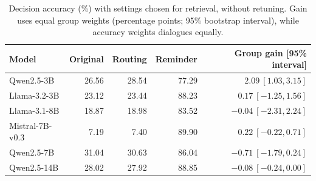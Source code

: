 \begin{table}[htbp]
\centering
\footnotesize
\setlength{\tabcolsep}{5pt}
\caption{Decision accuracy (\%) with settings chosen for retrieval, without
retuning. Gain uses equal group weights (percentage points; 95\% bootstrap
interval), while accuracy weights dialogues equally.}
\label{tab:repair-transfer}
\begin{tabular}{@{}lrrrr@{}}
\toprule
Model & Original & Routing & Reminder & Group gain [95\% interval] \\
\midrule
Qwen2.5-3B & 26.56 & 28.54 & 77.29 & $2.09\ [1.03, 3.15]$ \\
Llama-3.2-3B & 23.12 & 23.44 & 88.23 & $0.17\ [-1.25, 1.56]$ \\
Llama-3.1-8B & 18.87 & 18.98 & 83.52 & $-0.04\ [-2.31, 2.24]$ \\
Mistral-7B-v0.3 & 7.19 & 7.40 & 89.90 & $0.22\ [-0.22, 0.71]$ \\
\addlinespace[2pt]
Qwen2.5-7B & 31.04 & 30.63 & 86.04 & $-0.71\ [-1.79, 0.24]$ \\
Qwen2.5-14B & 28.02 & 27.92 & 88.85 & $-0.08\ [-0.24, 0.00]$ \\
\bottomrule
\end{tabular}
\end{table}
